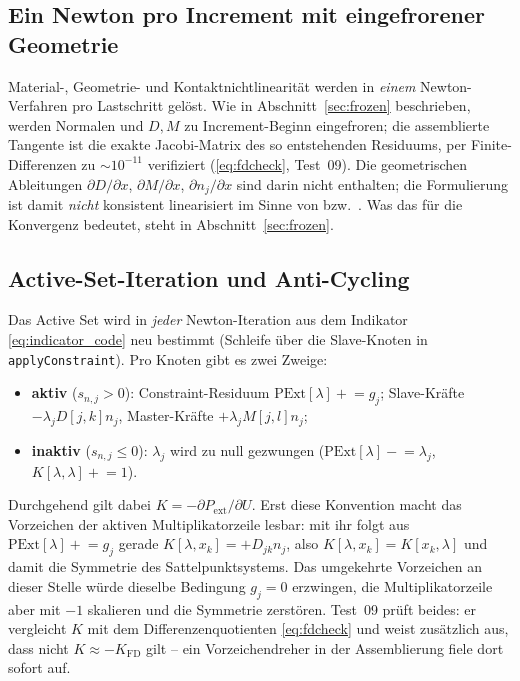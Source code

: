 \documentclass[a4paper,11pt]{article}
\def\bm#1{#1}%
\def\tilde#1{#1}%
\newcommand{\code}[1]{\texttt{\small #1}}
\begin{document}
\subsection{Ein Newton pro Increment mit eingefrorener Geometrie}
Material-, Geometrie- und Kontaktnichtlinearität werden in \emph{einem} Newton-Verfahren pro
Lastschritt gelöst. Wie in Abschnitt~\ref{sec:frozen} beschrieben, werden Normalen und
$\bm D,\bm M$ zu Increment-Beginn eingefroren; die assemblierte Tangente ist die exakte
Jacobi-Matrix des so entstehenden Residuums, per Finite-Differenzen zu $\sim10^{-11}$
verifiziert (\eqref{eq:fdcheck}, Test~09). Die geometrischen Ableitungen
$\partial\bm D/\partial\bm x$, $\partial\bm M/\partial\bm x$, $\partial\bm n_j/\partial\bm x$
sind darin nicht enthalten; die Formulierung ist damit \emph{nicht} konsistent linearisiert im
Sinne von \citet{popp2010} bzw.\ \citet[Kap.~4]{farah}. Was das für die Konvergenz bedeutet, steht
in Abschnitt~\ref{sec:frozen}.

\subsection{Active-Set-Iteration und Anti-Cycling}
Das Active Set wird in \emph{jeder} Newton-Iteration aus dem Indikator \eqref{eq:indicator_code} neu
bestimmt (Schleife über die Slave-Knoten in \code{applyConstraint}). Pro Knoten gibt es zwei
Zweige:
\begin{itemize}\itemsep2pt
  \item \textbf{aktiv} ($s_{n,j}>0$): Constraint-Residuum $\text{PExt}[\lambda]\!+\!\!=\!\tilde g_j$;
        Slave-Kräfte $-\lambda_j\bm D[j,k]\bm n_j$, Master-Kräfte $+\lambda_j\bm M[j,l]\bm n_j$;
  \item \textbf{inaktiv} ($s_{n,j}\le0$): $\lambda_j$ wird zu null gezwungen
        ($\text{PExt}[\lambda]\!-\!\!=\!\lambda_j$, $K[\lambda,\lambda]\!+\!\!=\!1$).
\end{itemize}

\noindent Durchgehend gilt dabei $\bm K=-\partial\bm P_{\text{ext}}/\partial\bm U$. Erst diese
Konvention macht das Vorzeichen der aktiven Multiplikatorzeile lesbar: mit ihr folgt aus
$\text{PExt}[\lambda]\!+\!\!=\!\tilde g_j$ gerade $K[\lambda,\bm x_k]=+D_{jk}\bm n_j$, also
$K[\lambda,\bm x_k]=K[\bm x_k,\lambda]$ und damit die Symmetrie des Sattelpunktsystems. Das
umgekehrte Vorzeichen an dieser Stelle würde dieselbe Bedingung $\tilde g_j=0$ erzwingen, die
Multiplikatorzeile aber mit $-1$ skalieren und die Symmetrie zerstören. Test~09 prüft beides:
er vergleicht $\bm K$ mit dem Differenzenquotienten \eqref{eq:fdcheck} und weist zusätzlich aus,
dass nicht $\bm K\approx-\bm K_{\text{FD}}$ gilt -- ein Vorzeichendreher in der Assemblierung
fiele dort sofort auf.
\end{document}
